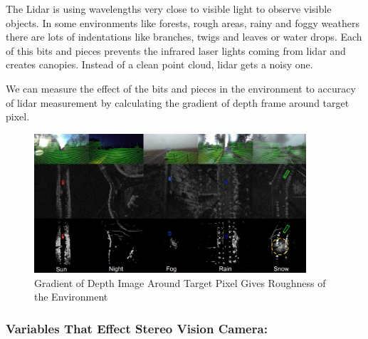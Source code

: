 \documentclass[12pt]{article}
\begin{document}
\begin{itemize}
          The Lidar is using wavelengths very close to visible light to observe visible objects. In some environments like forests, rough areas, rainy and foggy weathers there are lots of indentations like branches, twigs and leaves or water drops. Each of this bits and pieces prevents the infrared laser lights coming from lidar and creates canopies. Instead of a clean point cloud, lidar gets a noisy one.
          
          We can measure the effect of the bits and pieces in the environment to accuracy of lidar measurement by calculating the gradient of depth frame around target pixel.
          
          \begin{figure}[H]
              \centering
              \includegraphics[width=0.9\textwidth]{LidarViews.png}
              \caption{Gradient of Depth Image Around Target Pixel Gives Roughness of the Environment~\cite{https://doi.org/10.48550/arxiv.2010.09076}}
          \end{figure}
\end{itemize}


\subsubsection*{Variables That Effect Stereo Vision Camera:}
\end{document}
